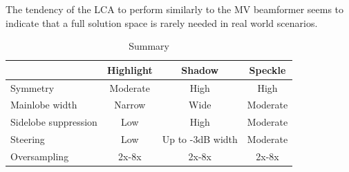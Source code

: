 \documentclass[10pt,journal,draftclsnofoot,onecolumn]{IEEEtran}
\let\MYoriglatexcaption\caption               %
\renewcommand{\caption}[2][\relax]{\MYoriglatexcaption[#2]{#2}}
\newcounter{todoidx}
\newlength\marginparwidthsmall
\newcommand\todo[1]{%
      \addtocounter{todoidx}{1}%
      {\color{Red}\bf(\thetodoidx{})}%
      \marginpar{%
         {\vspace*{-10pt}\color{Red}\fbox{\bf\thetodoidx{}}}\\%
         \fcolorbox{red}{todobackground}{\parbox{\marginparwidthsmall}{\raggedright\scriptsize #1}}}}
\newcommand\todopar[1]{\fcolorbox{red}{white}{\parbox{0.97\linewidth}{#1}}}
\newcommand\todo[1]{}
\newcommand\1{\vec 1}
\begin{document}
The tendency of the LCA to perform similarly to the MV beamformer seems to indicate that a full solution space is rarely needed in real world scenarios. 

\begin{table}[!b]\centering%
\begin{tabular}[c]{l c c c}\hline
\rowcolor{tabBlue} & \bf Highlight & \bf Shadow & \bf Speckle  \\\hline
Symmetry             & Moderate  & High   & High \\
Mainlobe width       & Narrow    & Wide   & Moderate \\
Sidelobe suppression & Low       & High   & Moderate \\
Steering             & Low       & Up to -3dB width & Moderate \\
Oversampling         & 2x-8x     & 2x-8x  & 2x-8x
\end{tabular}
\caption{Summary}\label{tab:summary}
\end{table}%


\end{document}

